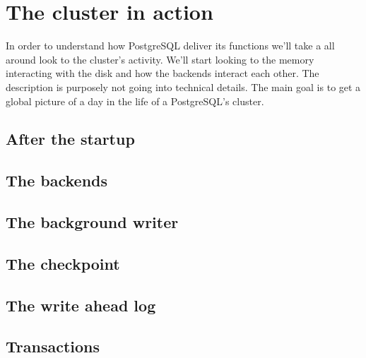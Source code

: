 \chapter{The cluster in action}
In order to understand how PostgreSQL deliver its functions we'll take a all around look to the cluster's 
activity. We'll start looking to the memory interacting with the disk and how the backends interact each 
other. The description is purposely not going into technical details. The main goal is to get a global 
picture of a day in the life of a PostgreSQL's cluster.

\section{After the startup}

\section{The backends}

\section{The background writer}

\section{The checkpoint}

\section{The write ahead log}

\section{Transactions}

